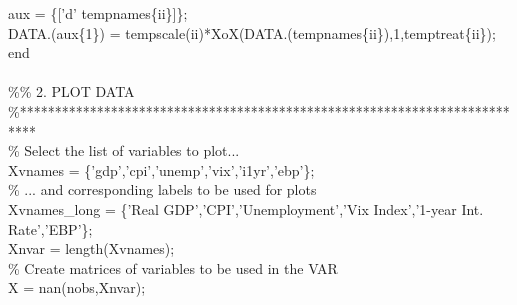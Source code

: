 \hspace{1mm}\hspace{5mm} aux = \{[\textcolor{matlabpurple}{'d'} tempnames\{ii\}]\}; \\ 
\hspace{1mm}\hspace{5mm} DATA.(aux\{1\}) = tempscale(ii)*XoX(DATA.(tempnames\{ii\}),1,temptreat\{ii\}); \\ 
\hspace{1mm}\textcolor{matlabblue}{end} \\ 
\hspace{1mm} \\ 
\hspace{1mm}\textcolor{matlabgreen}{\%}\textcolor{matlabgreen}{\% 2. PLOT DATA }\\ 
\hspace{1mm}\textcolor{matlabgreen}{\%**************************************************************************  }\\ 
\hspace{1mm}\textcolor{matlabgreen}{\% Select the list of variables to plot... }\\ 
\hspace{1mm}Xvnames = \{\textcolor{matlabpurple}{'gdp'},\textcolor{matlabpurple}{'cpi'},\textcolor{matlabpurple}{'unemp'},\textcolor{matlabpurple}{'vix'},\textcolor{matlabpurple}{'i1yr'},\textcolor{matlabpurple}{'ebp'}\}; \\ 
\hspace{1mm}\textcolor{matlabgreen}{\% ... and corresponding labels to be used \textcolor{matlabblue}{for} plots }\\ 
\hspace{1mm}\hspace{5mm} Xvnames\_long = \{\textcolor{matlabpurple}{'Real GDP'},\textcolor{matlabpurple}{'CPI'},\textcolor{matlabpurple}{'Unemployment'},\textcolor{matlabpurple}{'Vix Index'},\textcolor{matlabpurple}{'1-year Int. Rate'},\textcolor{matlabpurple}{'EBP'}\}; \\ 
\hspace{1mm}\hspace{5mm} Xnvar        = length(Xvnames); \\ 
\hspace{1mm}\hspace{5mm} \textcolor{matlabgreen}{\% Create matrices of variables to be used in the VAR }\\ 
\hspace{1mm}\hspace{5mm} X = nan(nobs,Xnvar); \\ 
